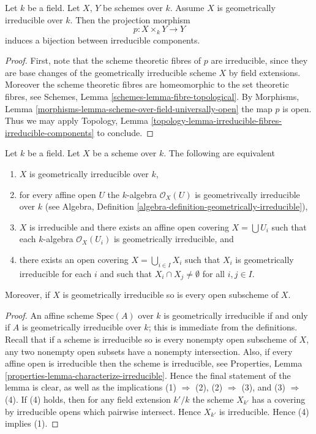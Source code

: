 \begin{lemma}
\label{lemma-bijection-irreducible-components}
Let $k$ be a field.
Let $X$, $Y$ be schemes over $k$.
Assume $X$ is geometrically irreducible over $k$.
Then the projection morphism
$$
p : X \times_k Y \longrightarrow Y
$$
induces a bijection between irreducible components.
\end{lemma}

\begin{proof}
First, note that the scheme theoretic fibres of $p$ are irreducible,
since they are base changes of the geometrically irreducible scheme $X$
by field extensions. Moreover the scheme theoretic fibres are
homeomorphic to the set theoretic fibres, see
Schemes, Lemma \ref{schemes-lemma-fibre-topological}.
By Morphisms, Lemma \ref{morphisms-lemma-scheme-over-field-universally-open}
the map $p$ is open.
Thus we may apply Topology,
Lemma \ref{topology-lemma-irreducible-fibres-irreducible-components}
to conclude.
\end{proof}

\begin{lemma}
\label{lemma-geometrically-irreducible-local}
Let $k$ be a field. Let $X$ be a scheme over $k$.
The following are equivalent
\begin{enumerate}
\item $X$ is geometrically irreducible over $k$,
\item for every affine open $U$ the $k$-algebra $\mathcal{O}_X(U)$
is geometrivcally irreducible over $k$ (see
Algebra, Definition \ref{algebra-definition-geometrically-irreducible}),
\item $X$ is irreducible and there exists an affine open covering
$X = \bigcup U_i$ such that each $k$-algebra $\mathcal{O}_X(U_i)$ is
geometrically irreducible, and
\item there exists an open covering $X = \bigcup_{i \in I} X_i$ such
that $X_i$ is geometrically irreducible for each $i$ and such that
$X_i \cap X_j \not = \emptyset$ for all $i, j \in I$.
\end{enumerate}
Moreover, if $X$ is geometrically irreducible so is every
open subscheme of $X$.
\end{lemma}

\begin{proof}
An affine scheme $\text{Spec}(A)$ over $k$ is geometrically
irreducible if and only if $A$ is geometrically irreducible over $k$;
this is immediate from the definitions.
Recall that if a scheme is irreducible so is every nonempty
open subscheme of $X$, any two nonempty open subsets have
a nonempty intersection. Also, if every affine open is irreducible
then the scheme is irreducible, see Properties,
Lemma \ref{properties-lemma-characterize-irreducible}.
Hence the final statement of the lemma
is clear, as well as the implications (1) $\Rightarrow$ (2),
(2) $\Rightarrow$ (3), and (3) $\Rightarrow$ (4). If (4) holds,
then for any field extension $k'/k$ the scheme $X_{k'}$
has a covering by irreducible opens which pairwise intersect.
Hence $X_{k'}$ is irreducible. Hence (4) implies (1).
\end{proof}

